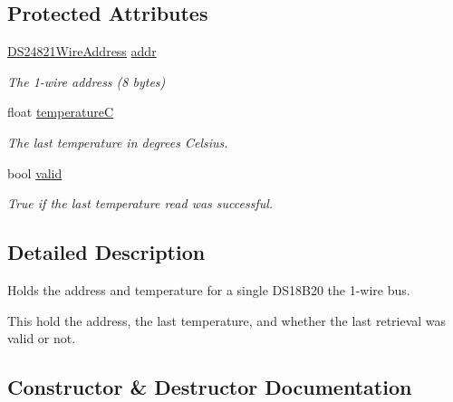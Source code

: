 \subsection*{Protected Attributes}
\begin{DoxyCompactItemize}
\item 
\mbox{\label{class_d_s2482_device_a83f16b37bc9a89032f9a3e4d096f2e1e}} 
\mbox{\hyperlink{class_d_s24821_wire_address}{D\+S24821\+Wire\+Address}} \mbox{\hyperlink{class_d_s2482_device_a83f16b37bc9a89032f9a3e4d096f2e1e}{addr}}
\begin{DoxyCompactList}\small\item\em The 1-\/wire address (8 bytes) \end{DoxyCompactList}\item 
\mbox{\label{class_d_s2482_device_ac69467f7fd8e076dffc9c0fc6c728dd0}} 
float \mbox{\hyperlink{class_d_s2482_device_ac69467f7fd8e076dffc9c0fc6c728dd0}{temperatureC}}
\begin{DoxyCompactList}\small\item\em The last temperature in degrees Celsius. \end{DoxyCompactList}\item 
\mbox{\label{class_d_s2482_device_ae07027aa55716a3bf25ae28379aa48ce}} 
bool \mbox{\hyperlink{class_d_s2482_device_ae07027aa55716a3bf25ae28379aa48ce}{valid}}
\begin{DoxyCompactList}\small\item\em True if the last temperature read was successful. \end{DoxyCompactList}\end{DoxyCompactItemize}


\subsection{Detailed Description}
Holds the address and temperature for a single D\+S18\+B20 the 1-\/wire bus. 

This hold the address, the last temperature, and whether the last retrieval was valid or not. 

\subsection{Constructor \& Destructor Documentation}
\mbox{\label{class_d_s2482_device_adf7bcc962188f30c285057f28914bf2a}} 
